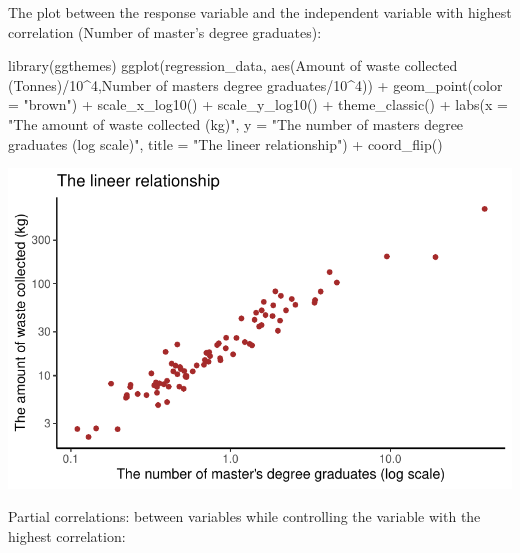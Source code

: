 \documentclass[
  11pt,
  a4paper,
  DIV=11,
  numbers=noendperiod]{scrartcl}
\newenvironment{Shaded}{\begin{snugshade}}{\end{snugshade}}
\newcommand{\AttributeTok}[1]{\textcolor[rgb]{0.40,0.45,0.13}{#1}}
\newcommand{\DecValTok}[1]{\textcolor[rgb]{0.68,0.00,0.00}{#1}}
\newcommand{\FunctionTok}[1]{\textcolor[rgb]{0.28,0.35,0.67}{#1}}
\newcommand{\NormalTok}[1]{\textcolor[rgb]{0.00,0.23,0.31}{#1}}
\newcommand{\SpecialCharTok}[1]{\textcolor[rgb]{0.37,0.37,0.37}{#1}}
\newcommand{\StringTok}[1]{\textcolor[rgb]{0.13,0.47,0.30}{#1}}
\begin{document}
The plot between the response variable and the independent variable with
{highest correlation (Number of master's degree graduates)}:

\begin{Shaded}
\begin{Highlighting}[]
\FunctionTok{library}\NormalTok{(ggthemes)}
\FunctionTok{ggplot}\NormalTok{(regression\_data, }\FunctionTok{aes}\NormalTok{(}\StringTok{\textasciigrave{}}\AttributeTok{Amount of waste collected (Tonnes)}\StringTok{\textasciigrave{}}\SpecialCharTok{/}\DecValTok{10}\SpecialCharTok{\^{}}\DecValTok{4}\NormalTok{,}\StringTok{\textasciigrave{}}\AttributeTok{Number of master\textquotesingle{}s degree graduates}\StringTok{\textasciigrave{}}\SpecialCharTok{/}\DecValTok{10}\SpecialCharTok{\^{}}\DecValTok{4}\NormalTok{)) }\SpecialCharTok{+} \FunctionTok{geom\_point}\NormalTok{(}\AttributeTok{color =} \StringTok{"brown"}\NormalTok{) }\SpecialCharTok{+} \FunctionTok{scale\_x\_log10}\NormalTok{() }\SpecialCharTok{+}
\FunctionTok{scale\_y\_log10}\NormalTok{() }\SpecialCharTok{+} \FunctionTok{theme\_classic}\NormalTok{() }\SpecialCharTok{+} \FunctionTok{labs}\NormalTok{(}\AttributeTok{x =} \StringTok{"The amount of waste collected (kg)"}\NormalTok{, }\AttributeTok{y =} \StringTok{"The number of master\textquotesingle{}s degree graduates (log scale)"}\NormalTok{, }\AttributeTok{title =} \StringTok{"The lineer relationship"}\NormalTok{) }\SpecialCharTok{+} \FunctionTok{coord\_flip}\NormalTok{()}
\end{Highlighting}
\end{Shaded}

\includegraphics{project_files/figure-pdf/unnamed-chunk-35-1.pdf}

{Partial correlations}: between variables while controlling the variable
with the highest correlation:
\end{document}

